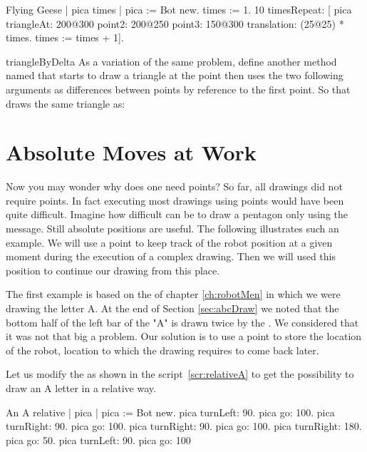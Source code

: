 \begin{scriptwithtitle}{Flying Geese}\label{scr:newflyinggeese2}
| pica  times |
pica := Bot new.
times := 1.
10 timesRepeat: 
        [ pica triangleAt: 200@300 
                    point2: 200@250 
                    point3: 150@300 translation: (25@25) * times.
        times := times + 1].
\end{scriptwithtitle}


\begin{exofig}{triangleByDelta}
As a variation of the same problem, define another method named  that starts to draw a triangle at the point  then uses the two following arguments as differences between points by reference  to the first point.
So that  draws the same triangle as: 
\end{exofig}



\section{Absolute Moves at Work}
Now you may wonder why does one need points? So far, all drawings did not require points. In fact executing most drawings using points would have been quite difficult. Imagine how difficult can be  to draw a pentagon only using the  message. 
Still absolute positions are useful. The following illustrates such an example. 
We will use a point to keep track of the robot position at a given moment during the execution of a complex drawing. Then we will used this position to continue our drawing from this place. 

The first example is based on the  of
chapter \ref{ch:robotMen} in which we were drawing the letter A. At the end of Section \ref{sec:abcDraw} we noted that the bottom
half of the left bar of the "A" is drawn twice by the 
. We considered that it was not
that big a problem.  Our solution is to use a point to store the location of the robot, location to which the drawing requires to come back later.

Let us modify the  as shown in the script~\ref{scr:relativeA} to get the possibility to draw an A letter in a relative way.  

\begin{scriptwithtitle}{An A relative}\label{scr:relativeA}
| pica |
pica := Bot new.
pica turnLeft: 90.
pica go: 100.
pica turnRight: 90.
pica go: 100.
pica turnRight: 90.
pica go: 100.
pica turnRight: 180.
pica go: 50.
pica turnLeft: 90.
pica go: 100
\end{scriptwithtitle}

